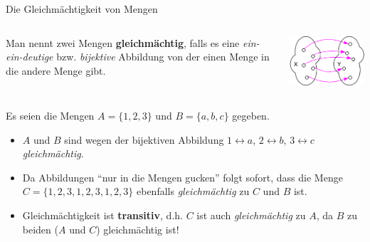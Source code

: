 \documentclass[12pt,ngerman,a4paper,ignorenonframetext,]{beamer}
\begin{document}
\begin{frame}{Die Gleichmächtigkeit von Mengen}
\protect\hypertarget{die-gleichmachtigkeit-von-mengen}{}

\begin{columns}[T]
\begin{column}{0.66\textwidth}

\begin{definition}

Man nennt zwei Mengen \textbf{gleichmächtig}, falls es eine
\emph{ein-ein-deutige} bzw. \emph{bijektive} Abbildung von der einen
Menge in die andere Menge gibt.

\end{definition}
\end{column}

\begin{column}{0.33\textwidth}
\begin{center}\includegraphics[width=0.7\linewidth]{./images/MGWI/Bijektivitaet_Mengenwolke} \end{center}
\end{column}
\end{columns}


\begin{Beispiele}[]

Es seien die Mengen \(A=\{1,2,3\}\) und \(B=\{a,b,c\}\) gegeben.

\begin{itemize}
\item
  \(A\) und \(B\) sind wegen der bijektiven Abbildung
  \(1 \leftrightarrow a\), \(2 \leftrightarrow b\),
  \(3 \leftrightarrow c\) \emph{gleichmächtig}.
\item
  Da Abbildungen ``nur in die Mengen gucken'' folgt sofort, dass die
  Menge \(C=\{1,2,3,1,2,3,1,2,3\}\) ebenfalls \emph{gleichmächtig} zu
  \(C\) und \(B\) ist.
\item
  Gleichmächtigkeit ist \textbf{transitiv},
  \mbox{d.\thinspace{}h.}\xspace{} \(C\) ist auch \emph{gleichmächtig}
  zu \(A\), da \(B\) zu beiden (\(A\) und \(C\)) gleichmächtig ist!
\end{itemize}

\end{Beispiele}

\end{frame}
\end{document}
